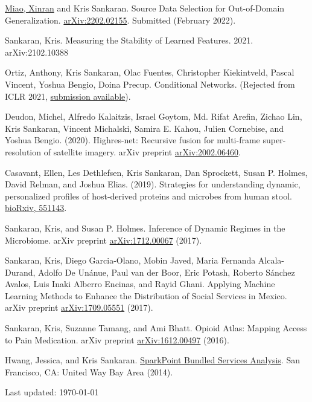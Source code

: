 \documentclass[letterpaper]{article}
\def\footerlink{}
\renewenvironment{itemize}{
  \begin{list}{}{
    \setlength{\leftmargin}{1.5em}
  }
}{
  \end{list}
}
\begin{document}
\begin{itemize}
\item \underline{Miao, Xinran} and Kris Sankaran. Source Data Selection for
Out-of-Domain Generalization.
\href{https://arxiv.org/abs/2202.02155}{arXiv:2202.02155}. Submitted (February
2022).
\item Sankaran, Kris. Measuring the Stability of Learned Features. 2021.
arXiv:2102.10388
\item Ortiz, Anthony, Kris Sankaran, Olac Fuentes, Christopher Kiekintveld,
  Pascal Vincent, Yoshua Bengio, Doina Precup. Conditional Networks. (Rejected
  from ICLR 2021, \href{https://openreview.net/forum?id=h8q8iZi-ks}{submission
    available}).
\item Deudon, Michel, Alfredo Kalaitzis, Israel Goytom, Md. Rifat Arefin, Zichao
  Lin, Kris Sankaran, Vincent Michalski, Samira E. Kahou, Julien Cornebise, and
  Yoshua Bengio. (2020). Highres-net: Recursive fusion for multi-frame
  super-resolution of satellite imagery. arXiv preprint
  \href{https://arxiv.org/abs/2002.06460}{arXiv:2002.06460}.
\item Casavant, Ellen, Les Dethlefsen, Kris Sankaran, Dan Sprockett, Susan P.
  Holmes, David Relman, and Joshua Elias. (2019). Strategies for understanding
  dynamic, personalized profiles of host-derived proteins and microbes from
  human stool. \href{https://www.biorxiv.org/content/10.1101/551143v1}{bioRxiv, 551143}.
 \item Sankaran, Kris, and Susan P. Holmes. Inference of Dynamic Regimes in the
   Microbiome. arXiv preprint \href{https://arxiv.org/abs/1712.00067}{arXiv:1712.00067} (2017).
\item Sankaran, Kris, Diego Garcia-Olano, Mobin Javed, Maria Fernanda
  Alcala-Durand, Adolfo De Unánue, Paul van der Boor, Eric Potash, Roberto
  S\'anchez Avalos, Luis Inaki Alberro Encinas, and Rayid Ghani. Applying
  Machine Learning Methods to Enhance the Distribution of Social Services in
  Mexico. arXiv preprint \href{https://arxiv.org/abs/1709.05551}{arXiv:1709.05551} (2017).
\item Sankaran, Kris, Suzanne Tamang, and Ami Bhatt. Opioid Atlas: Mapping
  Access to Pain Medication. arXiv preprint
  \href{https://arxiv.org/abs/1612.00497}{arXiv:1612.00497} (2016). \item Hwang,
  Jessica, and Kris Sankaran.
\href{https://uwba.org/wp-content/uploads/2022/04/UnitedWay_BayArea_2014_SparkPoint_Bundle_Services_FINAL.pdf}{SparkPoint
Bundled Services Analysis}. San Francisco, CA: United Way Bay Area (2014).
\end{itemize}


\begin{center}
  \begin{footnotesize}
    Last updated: \today \\
    \href{\footerlink}{\texttt{\footerlink}}
  \end{footnotesize}
\end{center}
\end{document}
